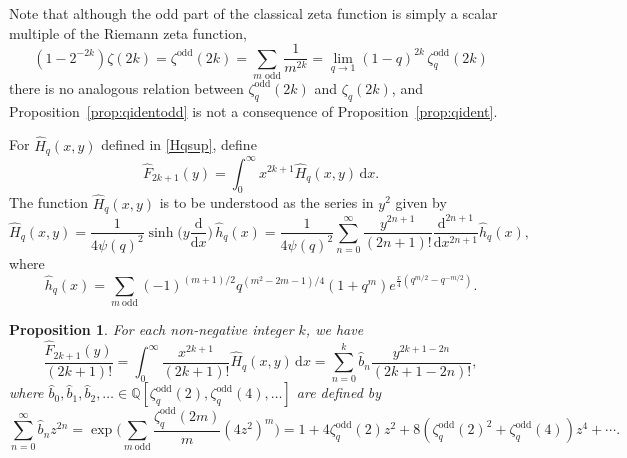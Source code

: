 \documentclass[a4paper]{article}
\theoremstyle{plain}
\newtheorem{proposition}[theorem]{Proposition}
\theoremstyle{definition}
\newcommand{\dd}{\mathrm{d}}
\newcommand{\bq}{\mathbb{Q}}
\begin{document}
Note that although the odd part of the classical zeta function is simply a scalar multiple of the Riemann zeta function, 
\[(1-2^{-2k})\zeta(2k)= \zeta^{\mathrm{odd}}(2k)=\sum_{m \text{ odd}} \frac{1}{m^{2k}}=\lim_{q \to 1} (1-q)^{2k} \, \zeta^{\mathrm{odd}}_q(2k) 
\]
there is no analogous relation between
$\zeta^{\mathrm{odd}}_q(2k)$ and $\zeta_q(2k)$, and  Proposition~\ref{prop:qidentodd} is not a consequence of Proposition~\ref{prop:qident}. %



For $\widehat{H}_q(x,y)$ defined in \cref{Hqsup}, define
\[
\widehat{F}_{2k+1}(y)=\int_0^\infty \!\! x^{2k+1}\widehat{H}_q(x,y) \, \dd x.
\]
The function $\widehat{H}_q(x,y)$ is to be understood as the series in $y^2$ given by
\[
\widehat{H}_q(x,y)=\frac{1}{4\psi(q)^2} \sinh \Big( y\frac{\dd}{\dd x} \Big) \, \widehat{h}_q(x)=\frac{1}{4\psi(q)^2}\sum_{n= 0}^\infty \frac{y^{2n+1}}{(2n+1)!} \frac{\dd^{2n+1}}{\dd x^{2n+1}} \widehat{h}_q(x),
\]
where
\[
\widehat{h}_q(x)=\sum_{m~\mathrm{odd}}(-1)^{(m+1)/2} q^{(m^2-2m-1)/4} (1+q^m)e^{\frac{x}{4}\left(q^{m/2}-q^{-m/2}\right)}.
\]


\begin{proposition} \label{prop:F2k+1odd}
For each non-negative integer $k$, we have
\[
\frac{\widehat{F}_{2k+1}(y)}{(2k+1)!} = \int_0^\infty \!\! \frac{x^{2k+1}}{(2k+1)!}\widehat{H}_q(x,y) \, \dd x = \sum_{n=0}^{k} \widehat{b}_n \frac{y^{2k+1-2n}}{(2k+1-2n)!},
\]
where $\widehat{b}_0, \widehat{b}_1, \widehat{b}_2, \ldots \in \bq[\zeta^{\mathrm{odd}}_q(2), \zeta^{\mathrm{odd}}_q(4), \ldots]$ are defined by
\[
\sum_{n=0}^\infty \widehat{b}_nz^{2n}=\exp \bigg( \sum_{m~\mathrm{odd}}\frac{\zeta^{\mathrm{odd}}_q(2m)}{m} (4z^2)^m \bigg) =1+4\zeta^{\mathrm{odd}}_q(2)z^2+8(\zeta^{\mathrm{odd}}_q(2)^2+\zeta^{\mathrm{odd}}_q(4))z^4 + \cdots.
\]
\end{proposition}
\end{document}
